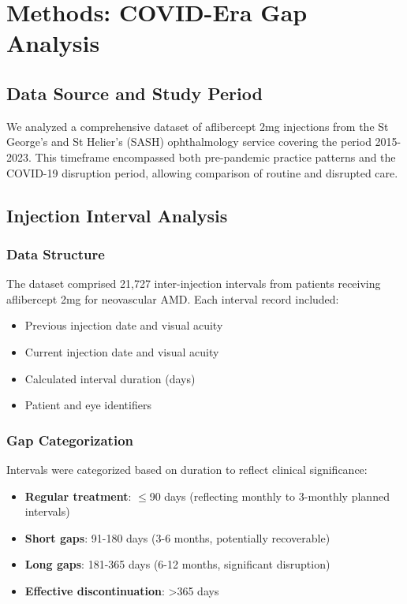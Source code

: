 \section{Methods: COVID-Era Gap Analysis}

\subsection{Data Source and Study Period}

We analyzed a comprehensive dataset of aflibercept 2mg injections from the St George's and St Helier's (SASH) ophthalmology service covering the period 2015-2023. This timeframe encompassed both pre-pandemic practice patterns and the COVID-19 disruption period, allowing comparison of routine and disrupted care.

\subsection{Injection Interval Analysis}

\subsubsection{Data Structure}
The dataset comprised 21,727 inter-injection intervals from patients receiving aflibercept 2mg for neovascular AMD. Each interval record included:
\begin{itemize}
    \item Previous injection date and visual acuity
    \item Current injection date and visual acuity
    \item Calculated interval duration (days)
    \item Patient and eye identifiers
\end{itemize}

\subsubsection{Gap Categorization}
Intervals were categorized based on duration to reflect clinical significance:
\begin{itemize}
    \item \textbf{Regular treatment}: $\leq$90 days (reflecting monthly to 3-monthly planned intervals)
    \item \textbf{Short gaps}: 91-180 days (3-6 months, potentially recoverable)
    \item \textbf{Long gaps}: 181-365 days (6-12 months, significant disruption)
    \item \textbf{Effective discontinuation}: >365 days
\end{itemize}

